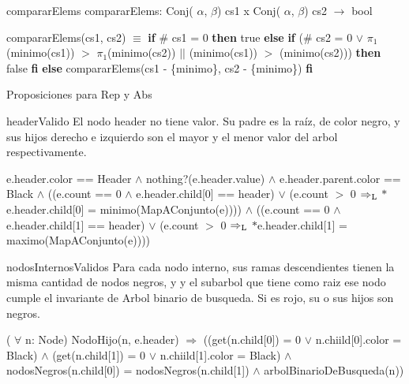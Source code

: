 \begin{DoxyParagraph}{comparar\-Elems}
comparar\-Elems\-: \-Conj( $\alpha$, $\beta$) cs1 x \-Conj( $\alpha$, $\beta$) cs2 $\to$ bool\par
 comparar\-Elems(cs1, cs2) $\equiv$ {\bfseries if} \# cs1 = 0 {\bfseries then} true {\bfseries else} {\bfseries if} (\# cs2 = 0 $\lor$ $\pi_1$(minimo(cs1)) $>$ $\pi_1$(minimo(cs2)) $|$$|$ (minimo(cs1)) $>$ (minimo(cs2))) {\bfseries then} false {\bfseries fi} {\bfseries else} comparar\-Elems(cs1 -\/ \{minimo\}, cs2 -\/ \{minimo\}) {\bfseries fi} 
\end{DoxyParagraph}
\-Proposiciones para \-Rep y \-Abs

\begin{DoxyParagraph}{header\-Valido}
\-El nodo header no tiene valor. \-Su padre es la raíz, de color negro, y sus hijos derecho e izquierdo son el mayor y el menor valor del arbol respectivamente.\par

\end{DoxyParagraph}
e.\-header.\-color == \-Header $\land$ nothing?(e.\-header.\-value) $\land$ e.\-header.\-parent.\-color == \-Black $\land$ ((e.\-count == 0 $\land$ e.\-header.\-child\mbox{[}0\mbox{]} == header) $\lor$ (e.\-count $>$ 0 $\Rightarrow_{\rm L}$ $\ast$e.header.\-child\mbox{[}0\mbox{]} = minimo(\-Map\-A\-Conjunto(e)))) $\land$ ((e.\-count == 0 $\land$ e.\-header.\-child\mbox{[}1\mbox{]} == header) $\lor$ (e.\-count $>$ 0 $\Rightarrow_{\rm L}$ $\ast$e.header.\-child\mbox{[}1\mbox{]} = maximo(\-Map\-A\-Conjunto(e)))) 

\begin{DoxyParagraph}{nodos\-Internos\-Validos}
\-Para cada nodo interno, sus ramas descendientes tienen la misma cantidad de nodos negros, y y el subarbol que tiene como raiz ese nodo cumple el invariante de \-Arbol binario de busqueda. \-Si es rojo, su o sus hijos son negros.
\end{DoxyParagraph}
( $\forall$ n\-: \-Node) \-Nodo\-Hijo(n, e.\-header) $\Rightarrow$ ((get(n.\-child\mbox{[}0\mbox{]}) = 0 $\lor$ n.\-chiild\mbox{[}0\mbox{]}.color = \-Black) $\land$ (get(n.\-child\mbox{[}1\mbox{]}) = 0 $\lor$ n.\-chiild\mbox{[}1\mbox{]}.color = \-Black) $\land$ nodos\-Negros(n.\-child\mbox{[}0\mbox{]}) = nodos\-Negros(n.\-child\mbox{[}1\mbox{]}) $\land$ arbol\-Binario\-De\-Busqueda(n)) 

